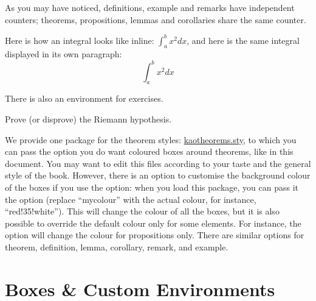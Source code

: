 As you may have noticed, definitions, example and remarks have 
independent counters; theorems, propositions, lemmas and corollaries 
share the same counter.

\begin{remark}
Here is how an integral looks like inline: $\int_{a}^{b} x^2 dx$, and 
here is the same integral displayed in its own paragraph:
\[\int_{a}^{b} x^2 dx\]
\end{remark}

There is also an environment for exercises.

\begin{exercise}
Prove (or disprove) the Riemann hypothesis.
\end{exercise}

We provide one package for the theorem styles: 
\href{kaotheorems.sty}{kaotheorems.sty}, to which you can pass the 
 option you do want coloured boxes around theorems, like 
in this document. You may want to edit this files according to your taste 
and the general style of the book. However, there is an option to 
customise the background colour of the boxes if you use the 
 option: when you load this package, you can pass it the 
 option (replace \enquote{mycolour} with the 
actual colour, for instance, \enquote{red!35!white}). This will change 
the colour of all the boxes, but it is also possible to override the 
default colour only for some elements. For instance, the 
 option will change the colour 
for propositions only. There are similar options for theorem, 
definition, lemma, corollary, remark, and example.

\section[Boxes \& Environments]{Boxes \& Custom Environments
}

